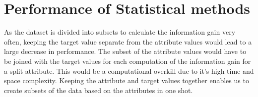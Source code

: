 \documentclass[11pt]{article}
\begin{document}
    \section{Performance of Statistical
methods}\label{performance-of-statistical-methods}

As the dataset is divided into subsets to calculate the information gain
very often, keeping the target value separate from the attribute values
would lead to a large decrease in performance. The subset of the
attribute values would have to be joined with the target values for each
computation of the information gain for a split attribute. This would be
a computational overkill due to it's high time and space complexity.
Keeping the attribute and target values together enables us to create
subsets of the data based on the attributes in one shot.
\end{document}

